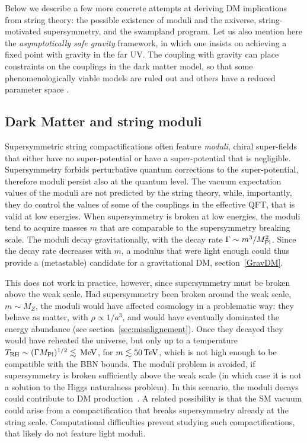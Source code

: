 Below we describe a few more concrete attempts at deriving DM implications from string theory: the possible existence of moduli and the axiverse, string-motivated supersymmetry, and the swampland program. Let us also mention here the {\em asymptotically safe gravity} framework, in which one insists on achieving a fixed point with gravity in the far UV. The coupling with gravity can place constraints on the couplings in the dark matter model, so that some phenomenologically viable models are ruled out and others have a reduced parameter space \cite{asymptoticallysafegravity}.




\subsection{Dark Matter and string moduli}
Supersymmetric string compactifications often feature {\em moduli}, chiral super-fields that either have no super-potential or have a super-potential that is negligible.
Supersymmetry forbids perturbative quantum corrections to the super-potential, therefore moduli persist also at the quantum level.
The  vacuum expectation values of the moduli are not predicted by the string theory, while, importantly, they do control the values of some of the couplings in the effective QFT, that is valid at low energies.
When supersymmetry is broken at low energies, the moduli tend to acquire masses $m$ that are comparable to the supersymmetry breaking scale.
The moduli decay gravitationally, with the decay rate $\Gamma \sim m^3/M_{\rm Pl}^2$.
Since the decay rate decreases with $m$, a modulus that were light enough could thus provide a (metastable) candidate for a gravitational DM, section~\ref{GravDM}.

This does not work in practice, however, since supersymmetry must be broken above the weak scale.
Had supersymmetry been broken around the weak scale,  $m \sim M_Z$, the moduli would have affected cosmology in a problematic way:
they behave as matter, with $\rho\propto 1/a^3$, and would have eventually dominated the energy abundance (see section~\ref{sec:misalignement}). Once they decayed they would have reheated the universe, but only
up to a temperature $T_{\rm RH} \sim (\Gamma M_{\rm Pl})^{1/2} \lesssim \,{\rm MeV}$, for  $m \lesssim 50\,{\rm TeV}$, which
is not high enough to be compatible with the BBN bounds. 
The moduli problem is avoided, if supersymmetry is broken sufficiently above the weak scale 
(in which case it is not a solution to the Higgs naturalness problem).
In this scenario, the moduli decays could contribute to DM production~\cite{moduli}.
A related possibility is that the SM vacuum could arise from a compactification that breaks supersymmetry already at the string scale.
Computational difficulties prevent studying such compactifications, that likely do not feature light moduli.


